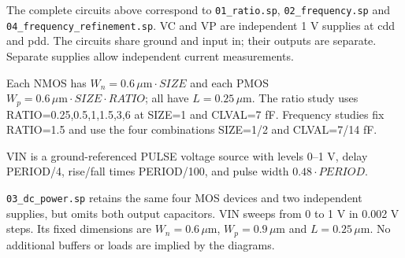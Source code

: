 The complete circuits above correspond to \nolinkurl{01_ratio.sp}, \nolinkurl{02_frequency.sp} and \nolinkurl{04_frequency_refinement.sp}. VC and VP are independent 1 V supplies at cdd and pdd. The circuits share ground and input in; their outputs are separate. Separate supplies allow independent current measurements.

Each NMOS has $W_n=0.6\,\mu\mathrm m\cdot SIZE$ and each PMOS $W_p=0.6\,\mu\mathrm m\cdot SIZE\cdot RATIO$; all have $L=0.25\,\mu$m. The ratio study uses RATIO=0.25,0.5,1,1.5,3,6 at SIZE=1 and CLVAL=7 fF. Frequency studies fix RATIO=1.5 and use the four combinations SIZE=1/2 and CLVAL=7/14 fF.

VIN is a ground-referenced PULSE voltage source with levels 0--1 V, delay PERIOD/4, rise/fall times PERIOD/100, and pulse width $0.48\cdot PERIOD$.

\nolinkurl{03_dc_power.sp} retains the same four MOS devices and two independent supplies, but omits both output capacitors. VIN sweeps from 0 to 1 V in 0.002 V steps. Its fixed dimensions are $W_n=0.6\,\mu$m, $W_p=0.9\,\mu$m and $L=0.25\,\mu$m. No additional buffers or loads are implied by the diagrams.

